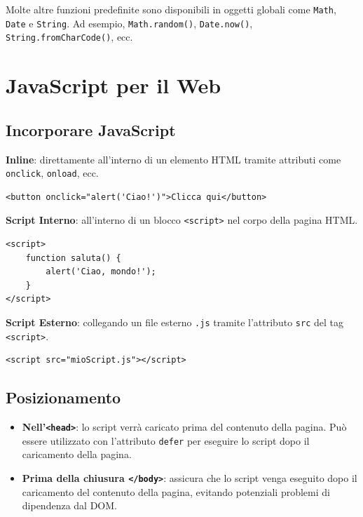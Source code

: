 Molte altre funzioni predefinite sono disponibili in oggetti globali come \texttt{Math}, \texttt{Date} e \texttt{String}. Ad esempio, \texttt{Math.random()}, \texttt{Date.now()}, \texttt{String.fromCharCode()}, ecc.

\section{JavaScript per il Web}

\subsection{Incorporare JavaScript}

\textbf{Inline}: direttamente all'interno di un elemento HTML tramite attributi come \texttt{onclick}, \texttt{onload}, ecc.

\begin{lstlisting}[language=HTML5]
<button onclick="alert('Ciao!')">Clicca qui</button>
\end{lstlisting}

\textbf{Script Interno}: all'interno di un blocco \texttt{<script>} nel corpo della pagina HTML.

\begin{lstlisting}[language=HTML5]
<script>
    function saluta() {
        alert('Ciao, mondo!');
    }
</script>
\end{lstlisting}

\textbf{Script Esterno}: collegando un file esterno \texttt{.js} tramite l'attributo \texttt{src} del tag \texttt{<script>}.

\begin{lstlisting}[language=HTML5]
<script src="mioScript.js"></script>
\end{lstlisting}

\subsection{Posizionamento}

\begin{itemize}
    \item \textbf{Nell'\texttt{<head>}}: lo script verrà caricato prima del contenuto della pagina. Può essere utilizzato con l'attributo \texttt{defer} per eseguire lo script dopo il caricamento della pagina.
    \item \textbf{Prima della chiusura \texttt{</body>}}: assicura che lo script venga eseguito dopo il caricamento del contenuto della pagina, evitando potenziali problemi di dipendenza dal DOM.
\end{itemize}

